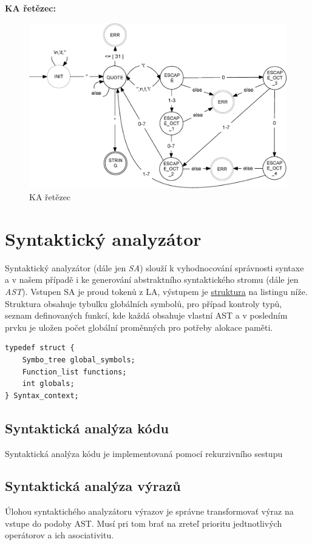 \documentclass[a4paper,11pt]{article}
\begin{document}
\newpage
\textbf{KA řetězec:} %
\begin{figure}[H]
\centering
\includegraphics[scale=.31]{FSM_STRING.eps}
\caption{KA řetězec}
\end{figure}



\section{Syntaktický analyzátor}
Syntaktický analyzátor (dále jen \textit{SA}) slouží k vyhodnocování správnosti syntaxe a v našem případě i ke generování abstraktního syntaktického stromu (dále jen \textit{AST}). Vstupen SA je proud tokenů z LA, výstupem je \hyperref[lst:saOut]{struktura} na listingu níže. Struktura obsahuje tybulku globálních symbolů, pro případ kontroly typů, seznam definovaných funkcí, kde každá obsahuje vlastní AST a v posledním prvku je uložen počet globální proměnných pro potřeby alokace paměti.

\begin{lstlisting}[caption={Výstupní struktura SA}, label={lst:saOut}]
typedef struct {
	Symbo_tree global_symbols;
	Function_list functions;
	int globals;
} Syntax_context;
\end{lstlisting}

\subsection{Syntaktická analýza kódu}
Syntaktická analýza kódu je implementovaná pomocí rekurzivního sestupu

\subsection{Syntaktická analýza výrazů}
Úlohou syntaktichého analyzátoru výrazov je správne transformovať výraz na vstupe do podoby AST. Musí pri tom brať na zreteľ prioritu jedtnotlivých operátorov a ich asociativitu.
\end{document}
